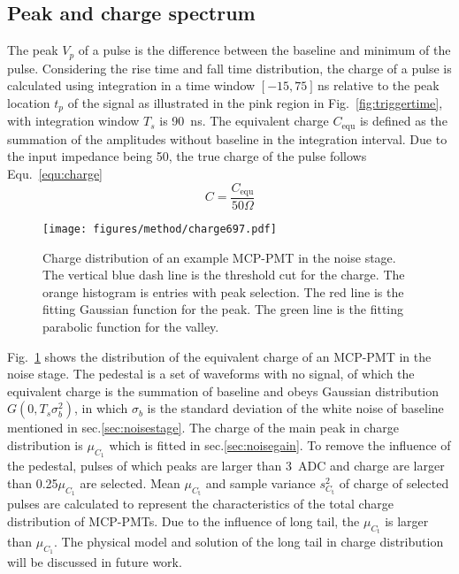 
\subsection{Peak and charge spectrum}
\label{sec:noisepeak}

The peak $V_p$ of a pulse is the difference between the baseline and minimum of the pulse. Considering the rise time and fall time distribution, the charge of a pulse is calculated using integration in a time window $[-15, 75]$\,ns relative to the peak location $t_p$ of the signal as illustrated in the pink region in Fig.~\ref{fig:triggertime}, with integration window $T_s$ is \SI{90}{ns}. The equivalent charge $C_{\mathrm{equ}}$ is defined as the summation of the amplitudes without baseline in the integration interval. Due to the input impedance being \SI{50}{\Omega}, the true charge of the pulse follows Equ.~\eqref{equ:charge} 
\begin{equation}
    \label{equ:charge}
    C = \frac{C_{\mathrm{equ}}}{50 \Omega}
\end{equation}

\begin{figure}[!htbp]
    \centering
    \texttt{[image: figures/method/charge697.pdf]}
    \caption{Charge distribution of an example MCP-PMT in the noise stage. The vertical blue dash line is the threshold cut for the charge. The orange histogram is entries with peak selection. The red line is the fitting Gaussian function for the peak. The green line is the fitting parabolic function for the valley.}
    \label{fig:charge}
\end{figure}

Fig.~\ref{fig:charge} shows the distribution of the equivalent charge of an MCP-PMT in the noise stage. The pedestal is a set of waveforms with no signal, of which the equivalent charge is the summation of baseline and obeys Gaussian distribution $G(0, T_s\sigma_b^2)$, in which $\sigma_b$ is the standard deviation of the white noise of baseline mentioned in sec.\ref{sec:noisestage}. The charge of the main peak in charge distribution is $\mu_{C_1}$ which is fitted in sec.\ref{sec:noisegain}. To remove the influence of the pedestal, pulses of which peaks are larger than \SI{3}{ADC} and charge are larger than 0.25$\mu_{C_1}$ are selected. Mean $\mu_{C_{\mathrm{t}}}$ and sample variance $s^2_{C_{\mathrm{t}}}$ of charge of selected pulses are calculated to represent the characteristics of the total charge distribution of MCP-PMTs. Due to the influence of long tail, the $\mu_{C_{\mathrm{t}}}$ is larger than $\mu_{C_1}$. The physical model and solution of the long tail in charge distribution will be discussed in future work.

